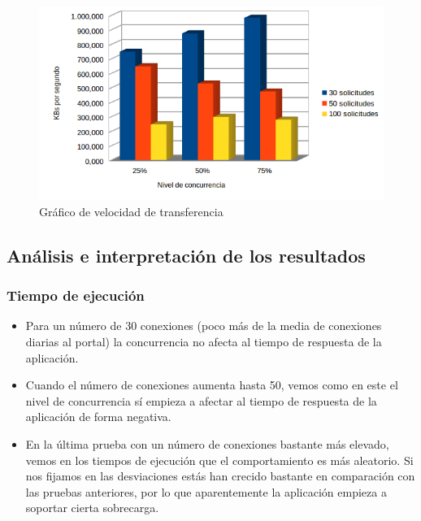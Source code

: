 \begin{figure}[!ht]
	\begin{center}
		\includegraphics[width=1\textwidth]{../images/gra_vt.png}
		\caption{Gráfico de velocidad de transferencia}
		\label{fig:gra_te}
	\end{center}
\end{figure}

\newpage
\subsection{Análisis e interpretación de los resultados}

\subsubsection{Tiempo de ejecución}
\begin{itemize}
	\item Para un número de 30 conexiones (poco más de la media de conexiones diarias al portal) la concurrencia no afecta al tiempo de respuesta de la aplicación.
	\item Cuando el número de conexiones aumenta hasta 50, vemos como en este el nivel de concurrencia sí empieza a afectar al tiempo de respuesta de la aplicación de forma negativa.
	\item En la última prueba con un número de conexiones bastante más elevado, vemos en los tiempos de ejecución que el comportamiento es más aleatorio. Si nos fijamos en las desviaciones estás han crecido bastante en comparación con las pruebas anteriores, por lo que aparentemente la aplicación empieza a soportar cierta sobrecarga.
\end{itemize}

